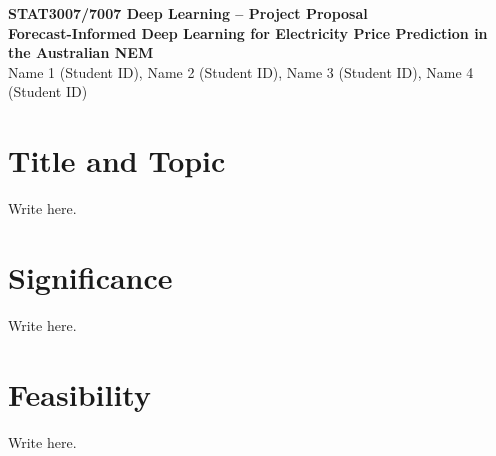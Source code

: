 \documentclass[10pt,a4paper]{article}
\begin{document}
\begin{center}
    {\large\bfseries STAT3007/7007 Deep Learning -- Project Proposal}\\[4pt]
    {\LARGE\bfseries Forecast-Informed Deep Learning for Electricity Price Prediction in the Australian NEM}\\[5pt]
    \small
    Name 1 (Student ID), Name 2 (Student ID), Name 3 (Student ID), Name 4 (Student ID)
\end{center}

\vspace{4pt}

\section*{Title and Topic}

Write here.

\section*{Significance}

Write here.

\section*{Feasibility}

Write here.



\end{document}
